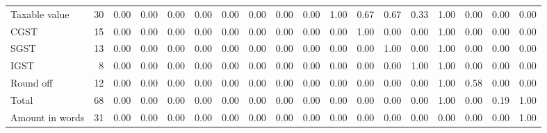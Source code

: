 \begin{tabular}{lrcccccccccccccccc}
Taxable value & 30 & 0.00 & 0.00 & 0.00 & 0.00 & 0.00 & 0.00 & 0.00 & 0.00 & 1.00 & 0.67 & 0.67 & 0.33 & 1.00 & 0.00 & 0.00 & 0.00\\
CGST & 15 & 0.00 & 0.00 & 0.00 & 0.00 & 0.00 & 0.00 & 0.00 & 0.00 & 0.00 & 1.00 & 0.00 & 0.00 & 1.00 & 0.00 & 0.00 & 0.00\\
SGST & 13 & 0.00 & 0.00 & 0.00 & 0.00 & 0.00 & 0.00 & 0.00 & 0.00 & 0.00 & 0.00 & 1.00 & 0.00 & 1.00 & 0.00 & 0.00 & 0.00\\
IGST & 8 & 0.00 & 0.00 & 0.00 & 0.00 & 0.00 & 0.00 & 0.00 & 0.00 & 0.00 & 0.00 & 0.00 & 1.00 & 1.00 & 0.00 & 0.00 & 0.00\\
Round off & 12 & 0.00 & 0.00 & 0.00 & 0.00 & 0.00 & 0.00 & 0.00 & 0.00 & 0.00 & 0.00 & 0.00 & 0.00 & 1.00 & 0.58 & 0.00 & 0.00\\
Total & 68 & 0.00 & 0.00 & 0.00 & 0.00 & 0.00 & 0.00 & 0.00 & 0.00 & 0.00 & 0.00 & 0.00 & 0.00 & 1.00 & 0.00 & 0.19 & 1.00\\
Amount in words & 31 & 0.00 & 0.00 & 0.00 & 0.00 & 0.00 & 0.00 & 0.00 & 0.00 & 0.00 & 0.00 & 0.00 & 0.00 & 0.00 & 0.00 & 0.00 & 1.00\\
\bottomrule
\end{tabular}
